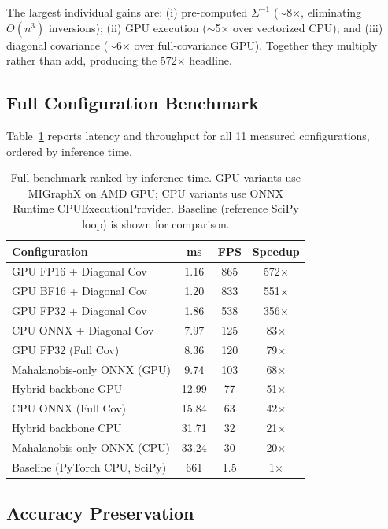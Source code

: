 \documentclass[blind]{gtac}
\begin{document}
The largest individual gains are: (i) pre-computed $\Sigma^{-1}$ ($\sim$8$\times$,
eliminating $O(n^3)$ inversions); (ii) GPU execution ($\sim$5$\times$ over
vectorized CPU); and (iii) diagonal covariance ($\sim$6$\times$ over
full-covariance GPU).  Together they multiply rather than add, producing the
572$\times$ headline.

\subsection{Full Configuration Benchmark}

Table~\ref{tab:benchmark} reports latency and throughput for all 11 measured
configurations, ordered by inference time.

\begin{table}[H]
\centering
\caption{Full benchmark ranked by inference time.  GPU variants use
MIGraphX on AMD GPU; CPU variants use ONNX Runtime CPUExecutionProvider.
Baseline (reference SciPy loop) is shown for comparison.}
\label{tab:benchmark}
\footnotesize
\begin{tabular}{@{}p{1.9in}ccc@{}}
\toprule
Configuration & ms & FPS & Speedup \\
\midrule
GPU FP16 + Diagonal Cov        &  1.16  & 865 & 572$\times$ \\
GPU BF16 + Diagonal Cov        &  1.20  & 833 & 551$\times$ \\
GPU FP32 + Diagonal Cov        &  1.86  & 538 & 356$\times$ \\
CPU ONNX + Diagonal Cov        &  7.97  & 125 &  83$\times$ \\
GPU FP32 (Full Cov)            &  8.36  & 120 &  79$\times$ \\
Mahalanobis-only ONNX (GPU)    &  9.74  & 103 &  68$\times$ \\
Hybrid backbone GPU            & 12.99  &  77 &  51$\times$ \\
CPU ONNX (Full Cov)            & 15.84  &  63 &  42$\times$ \\
Hybrid backbone CPU            & 31.71  &  32 &  21$\times$ \\
Mahalanobis-only ONNX (CPU)    & 33.24  &  30 &  20$\times$ \\
\midrule
Baseline (PyTorch CPU, SciPy)  & 661    & 1.5 & 1$\times$   \\
\bottomrule
\end{tabular}
\end{table}

\subsection{Accuracy Preservation}
\end{document}

